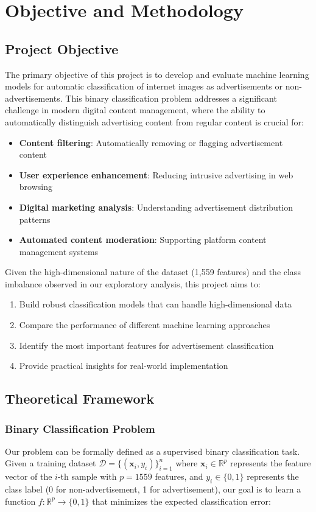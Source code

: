 \section{Objective and Methodology}
\label{sec:objective-methodology}

\subsection{Project Objective}
The primary objective of this project is to develop and evaluate machine learning models for automatic classification of internet images as advertisements or non-advertisements. This binary classification problem addresses a significant challenge in modern digital content management, where the ability to automatically distinguish advertising content from regular content is crucial for:

\begin{itemize}
    \item \textbf{Content filtering}: Automatically removing or flagging advertisement content
    \item \textbf{User experience enhancement}: Reducing intrusive advertising in web browsing
    \item \textbf{Digital marketing analysis}: Understanding advertisement distribution patterns
    \item \textbf{Automated content moderation}: Supporting platform content management systems
\end{itemize}

Given the high-dimensional nature of the dataset (1,559 features) and the class imbalance observed in our exploratory analysis, this project aims to:

\begin{enumerate}
    \item Build robust classification models that can handle high-dimensional data
    \item Compare the performance of different machine learning approaches
    \item Identify the most important features for advertisement classification
    \item Provide practical insights for real-world implementation
\end{enumerate}

\subsection{Theoretical Framework}
\subsubsection{Binary Classification Problem}
Our problem can be formally defined as a supervised binary classification task. Given a training dataset $\mathcal{D} = \{(\mathbf{x}_i, y_i)\}_{i=1}^{n}$ where $\mathbf{x}_i \in \mathbb{R}^p$ represents the feature vector of the $i$-th sample with $p = 1559$ features, and $y_i \in \{0, 1\}$ represents the class label (0 for non-advertisement, 1 for advertisement), our goal is to learn a function $f: \mathbb{R}^p \rightarrow \{0, 1\}$ that minimizes the expected classification error:

